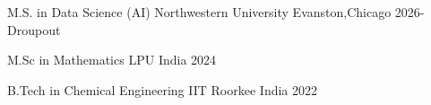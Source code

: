 

\begin{cventries}

  \cventry
    {M.S. in Data Science (AI)} %
    {Northwestern University} %
    { Evanston,Chicago} %
    {2026-Droupout} %
    {}


\cventry
    {M.Sc in Mathematics} %
    {LPU} %
    {India} %
    {2024} %
    {}

  \cventry
    {B.Tech in Chemical Engineering} %
    {IIT Roorkee} %
    {India} %
    {2022} %
    {}

\end{cventries}
